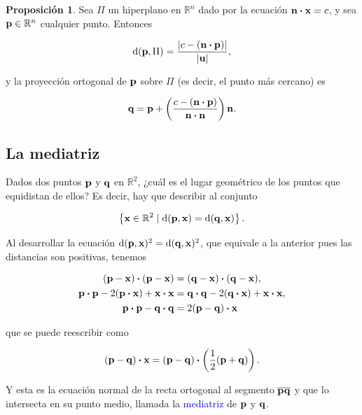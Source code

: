 \documentclass{article}
\theoremstyle{definicion}
\theoremstyle{definition}             %
\theoremstyle{definition}             %
\theoremstyle{definition}
\theoremstyle{definition}
\theoremstyle{observacion}
\theoremstyle{definition}
\newtheorem{prop}{Proposición}
\theoremstyle{plain}
\theoremstyle{definition}
\theoremstyle{afirmacion}
\theoremstyle{notation}
\theoremstyle{definition}
\begin{document}
        \begin{prop}
            Sea \(\Pi\) un hiperplano en \(\mathbb{R}^{n}\) dado por la ecuación \(\vb{n} \vdot \vb{x} = c\), y sea \(\vb{p} \in \mathbb{R}^{n}\) cualquier punto. Entonces

            \begin{equation*}
                \textrm{d}(\vb{p}, \Pi) = \dfrac{\abs{c - (\vb{n} \vdot \vb{p})}}{\abs{\vb{u}}},
            \end{equation*}

            y la proyección ortogonal de \(\vb{p}\) sobre \(\Pi\) (es decir, el punto más cercano) es

            \begin{equation*}
                \vb{q} = \vb{p} + \left(\dfrac{c - (\vb{n} \vdot \vb{p})}{\vb{n} \vdot \vb{n}}\right)\vb{n}.
            \end{equation*}
        \end{prop}

        \subsection{La mediatriz}

        Dados dos puntos \(\vb{p}\) y \(\vb{q}\) en \(\mathbb{R}^{2}\), ¿cuál es el lugar geométrico de los puntos que equidistan de ellos? Es decir, hay que describir al conjunto
        
        \begin{equation*}
            \left\lbrace\vb{x} \in \mathbb{R}^{2} \mid \textrm{d}(\vb{p}, \vb{x}) = \textrm{d}(\vb{q}, \vb{x})\right\rbrace.
        \end{equation*}

        Al desarrollar la ecuación \(\textrm{d}(\vb{p}, \vb{x})^{2} = \textrm{d}(\vb{q}, \vb{x})^{2}\), que equivale a la anterior pues las distancias son positivas, tenemos

        \begin{align*}
            (\vb{p} - \vb{x}) \vdot (\vb{p} - \vb{x}) &= (\vb{q} - \vb{x}) \vdot (\vb{q} - \vb{x}),\\
            \vb{p} \vdot \vb{p} - 2(\vb{p} \vdot \vb{x}) + \vb{x} \vdot \vb{x} &= \vb{q} \vdot \vb{q} - 2(\vb{q} \vdot \vb{x}) + \vb{x} \vdot \vb{x},\\
            \vb{p} \vdot \vb{p} - \vb{q} \vdot \vb{q} &= 2(\vb{p} - \vb{q}) \vdot \vb{x}
        \end{align*}

        que se puede reescribir como

        \begin{equation*}
            (\vb{p} - \vb{q}) \vdot \vb{x} = (\vb{p} - \vb{q}) \vdot \left(\dfrac{1}{2}(\vb{p} + \vb{q})\right).
        \end{equation*}

        Y esta es la ecuación normal de la recta ortogonal al segmento \(\overline{\vb{p}\vb{q}}\) y que lo intersecta en su punto medio, llamada la \textcolor{blue}{mediatriz} de \(\vb{p}\) y \(\vb{q}\).
\end{document}
